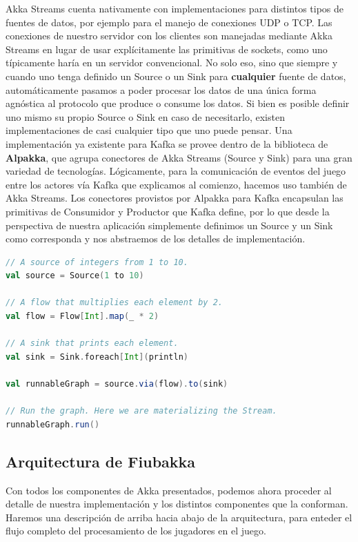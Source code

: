 Akka Streams cuenta nativamente con implementaciones para distintos tipos de fuentes de datos, por ejemplo para el manejo de conexiones UDP o TCP.
Las conexiones de nuestro servidor con los clientes son manejadas mediante Akka Streams en lugar de usar explícitamente las primitivas de sockets,
como uno típicamente haría en un servidor convencional. No solo eso, sino que siempre y cuando uno tenga definido un Source o un Sink
para \textbf{cualquier} fuente de datos, automáticamente pasamos a poder procesar los datos de una única forma agnóstica al protocolo que produce o consume
los datos. Si bien es posible definir uno mismo su propio Source o Sink en caso de necesitarlo, existen implementaciones de casi cualquier tipo que uno puede
pensar. Una implementación ya existente para Kafka se provee dentro de la biblioteca de \textbf{Alpakka}, que agrupa conectores de Akka Streams (Source y Sink)
para una gran variedad de tecnologías. Lógicamente, para la comunicación de eventos del juego entre los actores vía Kafka que explicamos al comienzo, hacemos
uso también de Akka Streams. Los conectores provistos por Alpakka para Kafka encapsulan las primitivas de Consumidor y Productor que Kafka define,
por lo que desde la perspectiva de nuestra aplicación simplemente definimos un Source y un Sink como corresponda y nos abstraemos de los detalles de implementación.

\begin{lstlisting}[language=Scala, caption={\textbf{Ejemplo de un Akka Stream}}]
// A source of integers from 1 to 10.
val source = Source(1 to 10)

// A flow that multiplies each element by 2.
val flow = Flow[Int].map(_ * 2)

// A sink that prints each element.
val sink = Sink.foreach[Int](println)

val runnableGraph = source.via(flow).to(sink)

// Run the graph. Here we are materializing the Stream.
runnableGraph.run()
\end{lstlisting}

\subsection{Arquitectura de Fiubakka}

\noindent Con todos los componentes de Akka presentados, podemos ahora proceder al detalle de nuestra implementación y los distintos componentes
que la conforman. Haremos una descripción de arriba hacia abajo de la arquitectura, para enteder el flujo completo del procesamiento de
los jugadores en el juego.

